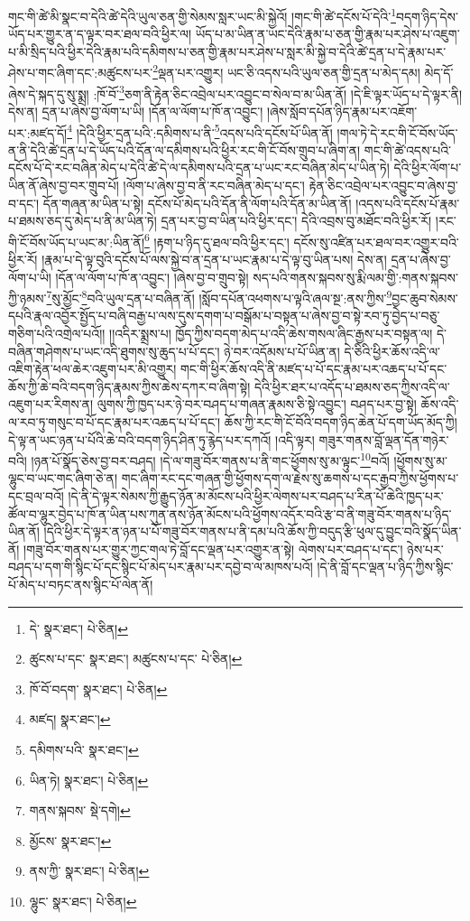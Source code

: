 གང་གི་ཚེ་མི་སྣང་བ་དེའི་ཚེ་དེའི་ཡུལ་ཅན་གྱི་སེམས་སླར་ཡང་མི་སྐྱེའོ། །གང་གི་ཚེ་དངོས་པོ་དེའི་\footnote{དེ་  སྣར་ཐང་།  པེ་ཅིན། }བདག་ཉིད་དེས་ཡོད་པར་གྱུར་ན་ད་ལྟར་བར་ཐལ་བའི་ཕྱིར་ལ། ཡོད་པ་མ་ཡིན་ན་ཡང་དེའི་རྣམ་པ་ཅན་གྱི་རྣམ་པར་ཤེས་པ་འཇུག་པ་མི་སྲིད་པའི་ཕྱིར་དེའི་རྣམ་པའི་དམིགས་པ་ཅན་གྱི་རྣམ་པར་ཤེས་པ་སླར་མི་སྐྱེ་བ་དེའི་ཚེ་དྲན་པ་དེ་རྣམ་པར་ཤེས་པ་གང་ཞིག་དང་:མཚུངས་པར་\footnote{ཚུངས་པ་དང་  སྣར་ཐང་། མཚུངས་པ་དང་  པེ་ཅིན། }ལྡན་པར་འགྱུར། ཡང་ཅི་འདས་པའི་ཡུལ་ཅན་གྱི་དྲན་པ་མེད་དམ། མེད་དོ་ཞེས་དེ་སྐད་དུ་སུ་སྨྲ། :ཁོ་བོ་\footnote{ཁོ་བོ་བདག་  སྣར་ཐང་།  པེ་ཅིན། }ཅག་ནི་རྟེན་ཅིང་འབྲེལ་པར་འབྱུང་བ་སེལ་བ་མ་ཡིན་ནོ། །དེ་ཇི་ལྟར་ཡོད་པ་དེ་ལྟར་ནི། དེས་ན། དྲན་པ་ཞེས་བྱ་ལོག་པ་ཡི། །དོན་ལ་ལོག་པ་ཁོ་ན་འབྱུང་། །ཞེས་སློབ་དཔོན་ཉིད་རྣམ་པར་འཇོག་པར་:མཛད་དོ།\footnote{མཛད།  སྣར་ཐང་། } །དེའི་ཕྱིར་དྲན་པའི་:དམིགས་པ་ནི་\footnote{དམིགས་པའི་  སྣར་ཐང་། }འདས་པའི་དངོས་པོ་ཡིན་ནོ། །གལ་ཏེ་དེ་རང་གི་ངོ་བོས་ཡོད་ན་ནི་དེའི་ཚེ་དྲན་པ་དེ་ཡོད་པའི་དོན་ལ་དམིགས་པའི་ཕྱིར་རང་གི་ངོ་བོས་གྲུབ་པ་ཞིག་ན། གང་གི་ཚེ་འདས་པའི་དངོས་པོ་དེ་རང་བཞིན་མེད་པ་དེའི་ཚེ་དེ་ལ་དམིགས་པའི་དྲན་པ་ཡང་རང་བཞིན་མེད་པ་ཡིན་ཏེ། དེའི་ཕྱིར་ལོག་པ་ཡིན་ནོ་ཞེས་བྱ་བར་གྲུབ་པོ། །ལོག་པ་ཞེས་བྱ་བ་ནི་རང་བཞིན་མེད་པ་དང་། རྟེན་ཅིང་འབྲེལ་པར་འབྱུང་བ་ཞེས་བྱ་བ་དང་། དོན་གཞན་མ་ཡིན་པ་སྟེ། དངོས་པོ་མེད་པའི་དོན་ནི་ལོག་པའི་དོན་མ་ཡིན་ནོ། །འདས་པའི་དངོས་པོ་རྣམ་པ་ཐམས་ཅད་དུ་མེད་པ་ནི་མ་ཡིན་ཏེ། དྲན་པར་བྱ་བ་ཡིན་པའི་ཕྱིར་དང་། དེའི་འབྲས་བུ་མཐོང་བའི་ཕྱིར་རོ། །རང་གི་ངོ་བོས་ཡོད་པ་ཡང་མ་:ཡིན་ནོ།\footnote{ཡིན་ཏེ།  སྣར་ཐང་།  པེ་ཅིན། } །རྟག་པ་ཉིད་དུ་ཐལ་བའི་ཕྱིར་དང་། དངོས་སུ་འཛིན་པར་ཐལ་བར་འགྱུར་བའི་ཕྱིར་རོ། །རྣམ་པ་དེ་ལྟ་བུའི་དངོས་པོ་ལས་སྐྱེ་བ་ན་དྲན་པ་ཡང་རྣམ་པ་དེ་ལྟ་བུ་ཡིན་པས། དེས་ན། དྲན་པ་ཞེས་བྱ་ལོག་པ་ཡི། །དོན་ལ་ལོག་པ་ཁོ་ན་འབྱུང་། །ཞེས་བྱ་བ་གྲུབ་སྟེ། སད་པའི་གནས་སྐབས་སུ་རྨི་ལམ་གྱི་:གནས་སྐབས་ཀྱི་ཉམས་\footnote{གནས་སྐབས་  སྡེ་དགེ། }སུ་མྱོང་\footnote{མྱོངས་  སྣར་ཐང་། }བའི་ཡུལ་དྲན་པ་བཞིན་ནོ། །སློབ་དཔོན་འཕགས་པ་ལྟའི་ཞལ་སྔ་:ནས་ཀྱིས་\footnote{ནས་ཀྱི་  སྣར་ཐང་།  པེ་ཅིན། }བྱང་ཆུབ་སེམས་དཔའི་རྣལ་འབྱོར་སྤྱོད་པ་བཞི་བརྒྱ་པ་ལས་དུས་དགག་པ་བསྒོམ་པ་བསྟན་པ་ཞེས་བྱ་བ་སྟེ་རབ་ཏུ་བྱེད་པ་བཅུ་གཅིག་པའི་འགྲེལ་པའོ།། །།འདིར་སྨྲས་པ། ཁྱོད་ཀྱིས་བདག་མེད་པ་འདི་ཆེས་གསལ་ཞིང་རྒྱས་པར་བསྟན་ལ། དེ་བཞིན་གཤེགས་པ་ཡང་འདི་ཐུགས་སུ་ཆུད་པ་པོ་དང་། ཉེ་བར་འདོམས་པ་པོ་ཡིན་ན། དེ་ཅིའི་ཕྱིར་ཆོས་འདི་ལ་འཇིག་རྟེན་ཕལ་ཆེར་འཇུག་པར་མི་འགྱུར། གང་གི་ཕྱིར་ཆོས་འདི་ནི་མཛད་པ་པོ་དང་རྣམ་པར་འཆད་པ་པོ་དང་ཆོས་ཀྱི་ཆེ་བའི་བདག་ཉིད་རྣམས་ཀྱིས་ཆེས་དཀར་བ་ཞིག་སྟེ། དེའི་ཕྱིར་ཐར་པ་འདོད་པ་ཐམས་ཅད་ཀྱིས་འདི་ལ་འཇུག་པར་རིགས་ན། ལུགས་ཀྱི་ཁྱད་པར་ཉེ་བར་བཤད་པ་གཞན་རྣམས་ཅི་སྟེ་འབྱུང་། བཤད་པར་བྱ་སྟེ། ཆོས་འདི་ལ་རབ་ཏུ་གསུང་བ་པོ་དང་རྣམ་པར་འཆད་པ་པོ་དང་། ཆོས་ཀྱི་རང་གི་ངོ་བོའི་བདག་ཉིད་ཆེན་པོ་དག་ཡོད་མོད་ཀྱི། དེ་ལྟ་ན་ཡང་ཉན་པ་པོའི་ཆེ་བའི་བདག་ཉིད་ཤིན་ཏུ་རྙེད་པར་དཀའོ། །འདི་ལྟར། གཟུར་གནས་བློ་ལྡན་དོན་གཉེར་བའི། །ཉན་པོ་སྣོད་ཅེས་བྱ་བར་བཤད། །དེ་ལ་གཟུ་བོར་གནས་པ་ནི་གང་ཕྱོགས་སུ་མ་ལྟུང་\footnote{ལྷུང་  སྣར་ཐང་།  པེ་ཅིན། }བའོ། །ཕྱོགས་སུ་མ་ལྷུང་བ་ཡང་གང་ཞིག་ཅེ་ན། གང་ཞིག་རང་དང་གཞན་གྱི་ཕྱོགས་དག་ལ་རྗེས་སུ་ཆགས་པ་དང་རྒྱབ་ཀྱིས་ཕྱོགས་པ་དང་བྲལ་བའོ། །དེ་ནི་དེ་ལྟར་སེམས་ཀྱི་རྒྱུད་ཉོན་མ་མོངས་པའི་ཕྱིར་ལེགས་པར་བཤད་པ་རིན་པོ་ཆེའི་ཁྱད་པར་ཚོལ་བ་ལྷུར་བྱེད་པ་ཁོ་ན་ཡིན་པས་ཀུན་ནས་ཉོན་མོངས་པའི་ཕྱོགས་འདོར་བའི་རྩ་བ་ནི་གཟུ་བོར་གནས་པ་ཉིད་ཡིན་ནོ། །དེའི་ཕྱིར་དེ་ལྟར་ན་ཉན་པ་པོ་གཟུ་བོར་གནས་པ་ནི་དམ་པའི་ཆོས་ཀྱི་བདུད་རྩི་ཕུལ་དུ་བྱུང་བའི་སྣོད་ཡིན་ནོ། །གཟུ་བོར་གནས་པར་གྱུར་ཀྱང་གལ་ཏེ་བློ་དང་ལྡན་པར་འགྱུར་ན་སྟེ། ལེགས་པར་བཤད་པ་དང་། ཉེས་པར་བཤད་པ་དག་གི་སྙིང་པོ་དང་སྙིང་པོ་མེད་པར་རྣམ་པར་དབྱེ་བ་ལ་མཁས་པའོ། །དེ་ནི་བློ་དང་ལྡན་པ་ཉིད་ཀྱིས་སྙིང་པོ་མེད་པ་བཏང་ནས་སྙིང་པོ་ལེན་ནོ། 
